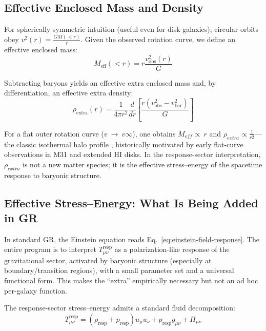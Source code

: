 \documentclass[11pt]{article}
\begin{document}
\subsection{Effective Enclosed Mass and Density}\label{effective-enclosed-mass-and-density}

For spherically symmetric intuition (useful even for disk galaxies), circular orbits obey \(v^2(r) = \frac{GM(<r)}{r}\). Given the observed rotation curve, we define an effective enclosed mass:
\begin{equation*}
M_{\text{eff}}(<r) = r\frac{v_{\text{obs}}^{2}(r)}{G}
\end{equation*}

Subtracting baryons yields an effective extra enclosed mass and, by differentiation, an effective extra density:
\begin{equation*}
\rho_{\text{extra}}(r) = \frac{1}{4\pi r^{2}}\frac{d}{dr}\left[ \frac{r(v_{\text{obs}}^{2} - v_{\text{bar}}^{2})}{G} \right]
\end{equation*}

For a flat outer rotation curve (\(v\  \rightarrow \ v\infty\)), one obtains \(M_{eff} \propto \ r\) and \(\rho_{extra} \propto \frac{1}{r2}\)---the classic isothermal halo profile \citep{Rubin1970, Bosma1978}, historically motivated by early flat-curve observations in M31 and extended HI disks. In the response-sector interpretation, \(\rho_{extra}\) is not a new matter species; it is the effective stress--energy of the spacetime response to baryonic structure.

\subsection{Effective Stress--Energy: What Is Being Added in GR}\label{effective-stressenergy-what-is-being-added-in-gr}

In standard GR, the Einstein equation reads Eq.~\eqref{eq:einstein-field-response}. The entire program is to interpret \(T_{\mu\nu}^{\text{resp}}\) as a polarization-like response of the gravitational sector, activated by baryonic structure (especially at boundary/transition regions), with a small parameter set and a universal functional form. This makes the ``extra'' empirically necessary but not an ad hoc per-galaxy function.

The response-sector stress--energy admits a standard fluid decomposition:
\begin{equation*}
T^{\text{resp}}_{\mu\nu} = (\rho_{\text{resp}} + p_{\text{resp}})u_{\mu}u_{\nu} + p_{\text{resp}}g_{\mu\nu} + \Pi_{\mu\nu}
\end{equation*}
\end{document}
